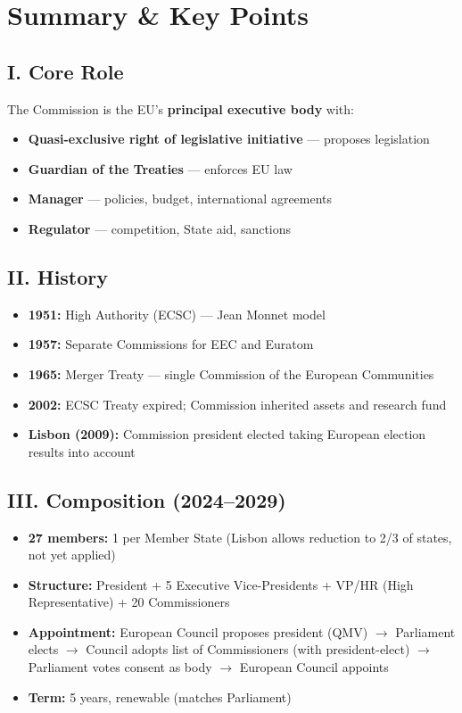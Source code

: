 \documentclass[11pt,a4paper]{article}
\begin{document}
\section*{Summary \& Key Points}

\subsection*{I. Core Role}

The Commission is the EU's \textbf{principal executive body} with:
\begin{itemize}
\item \textbf{Quasi-exclusive right of legislative initiative} --- proposes legislation
\item \textbf{Guardian of the Treaties} --- enforces EU law
\item \textbf{Manager} --- policies, budget, international agreements
\item \textbf{Regulator} --- competition, State aid, sanctions
\end{itemize}

\subsection*{II. History}

\begin{itemize}
\item \textbf{1951:} High Authority (ECSC) --- Jean Monnet model
\item \textbf{1957:} Separate Commissions for EEC and Euratom
\item \textbf{1965:} Merger Treaty --- single Commission of the European Communities
\item \textbf{2002:} ECSC Treaty expired; Commission inherited assets and research fund
\item \textbf{Lisbon (2009):} Commission president elected taking European election results into account
\end{itemize}

\subsection*{III. Composition (2024--2029)}

\begin{itemize}
\item \textbf{27 members:} 1 per Member State (Lisbon allows reduction to 2/3 of states, not yet applied)
\item \textbf{Structure:} President + 5 Executive Vice-Presidents + VP/HR (High Representative) + 20 Commissioners
\item \textbf{Appointment:} European Council proposes president (QMV) $\to$ Parliament elects $\to$ Council adopts list of Commissioners (with president-elect) $\to$ Parliament votes consent as body $\to$ European Council appoints
\item \textbf{Term:} 5 years, renewable (matches Parliament)
\end{itemize}
\end{document}

